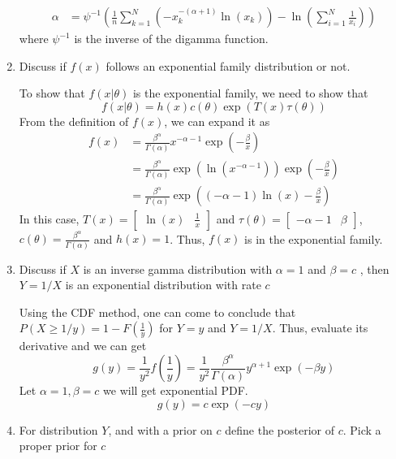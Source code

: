\documentclass{article}
\begin{document}
\begin{enumerate}
\begin{sol}
\begin{align*}
        \alpha &= \psi^{-1}\left( \frac{1}{n}\sum_{k=1}^N (-x_k^{-(\alpha+1)}\ln(x_k)) - \ln(\sum_{i=1}^N \frac{1}{x_i})\right)
    \end{align*}
    where $\psi^{-1}$ is the inverse of the digamma function.
    \end{sol}
    \color{black}
    \item Discuss if $f(x)$ follows an exponential family distribution or not. 
    \color{blue}
    \begin{sol}
    To show that $f(x|\theta)$ is the exponential family, we need to show that
    $$f(x|\theta) = h(x)c(\theta) \exp(T(x)\tau(\theta))$$
    From the definition of $f(x)$, we can expand it as
    \begin{align*}
        f(x) &= \frac{\beta^\alpha}{\Gamma(\alpha)} x^{-\alpha-1}\exp\left(-\frac{\beta}{x}\right) \\
        &= \frac{\beta^\alpha}{\Gamma(\alpha)}\exp\left(\ln(x^{-\alpha-1})\right)\exp\left(-\frac{\beta}{x}\right)\\
        &=  \frac{\beta^\alpha}{\Gamma(\alpha)} \exp\left((-\alpha-1)\ln(x) - \frac{\beta}{x}\right)
    \end{align*}
    In this case, $T(x) = \begin{bmatrix}\ln(x) & \frac{1}{x}\end{bmatrix}$ and $\tau(\theta) = \begin{bmatrix}
        -\alpha - 1 & \beta
    \end{bmatrix}$, $c(\theta) =\frac{\beta^\alpha}{\Gamma(\alpha)}$ and $h(x) = 1$. Thus, $f(x)$ is in the exponential family.
    \end{sol}
    \color{black}
    \item Discuss if $X$ is an inverse gamma distribution with $\alpha =1$  and $\beta =c$ , then $Y=1/X$ is an exponential distribution with rate $c$ 
    \color{blue}
    \begin{sol}
        Using the CDF method, one can come to conclude that $P(X\geq 1/y) = 1-F(\frac{1}{y})$ for $Y = y$ and $Y = 1/X$. Thus, evaluate its derivative and we can get
        $$g(y) = \frac{1}{y^2}f\left(\frac{1}{y}\right) = \frac{1}{y^2}\frac{\beta^\alpha}{\Gamma(\alpha)}y^{\alpha+1}\exp\left(-\beta y\right)$$
        Let $\alpha = 1, \beta = c$ we will get exponential PDF.
        $$g(y) = c\exp(-cy)$$
    \end{sol}
    \color{black}
    \item For distribution $Y$, and with a prior on $c$ define the posterior of $c$. Pick a proper prior for $c$ 

\end{enumerate}
\end{document}
